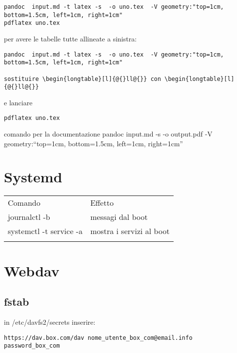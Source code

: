 \documentclass[]{article}
\begin{document}
\begin{verbatim}
pandoc  input.md -t latex -s  -o uno.tex  -V geometry:"top=1cm, bottom=1.5cm, left=1cm, right=1cm"
pdflatex uno.tex
\end{verbatim}

per avere le tabelle tutte allineate a sinistra:

\begin{verbatim}
pandoc  input.md -t latex -s  -o uno.tex  -V geometry:"top=1cm, bottom=1.5cm, left=1cm, right=1cm"

sostituire \begin{longtable}[l]{@{}ll@{}} con \begin{longtable}[l]{@{}ll@{}}
\end{verbatim}

e lanciare

\begin{verbatim}
pdflatex uno.tex
\end{verbatim}

comando per la documentazione pandoc input.md -s -o output.pdf -V
geometry:``top=1cm, bottom=1.5cm, left=1cm, right=1cm''

\section{Systemd}\label{systemd}

\begin{longtable}[l]{@{}ll@{}}
\toprule\addlinespace
Comando & Effetto
\\\addlinespace
\midrule\endhead
journalctl -b & messagi dal boot
\\\addlinespace
systemctl -t service -a & mostra i servizi al boot
\\\addlinespace
\bottomrule
\end{longtable}

\section{Webdav}\label{webdav}

\subsection{fstab}\label{fstab}

in /etc/davfs2/secrets inserire:

\begin{verbatim}
https://dav.box.com/dav nome_utente_box_com@email.info password_box_com
\end{verbatim}
\end{document}

